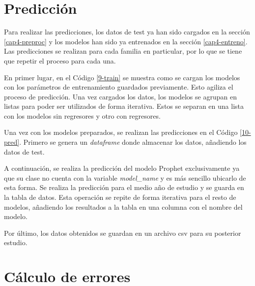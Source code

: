 

\section{Predicción}

Para realizar las predicciones, los datos de test ya han sido cargados en la sección \ref{cap4-preproc} y los modelos han sido ya entrenados en la sección \ref{cap4-entreno}. Las predicciones se realizan para cada familia en particular, por lo que se tiene que repetir el proceso para cada una.

En primer lugar, en el Código \ref{9-train} se muestra como se cargan los modelos con los parámetros de entrenamiento guardados previamente. Esto agiliza el proceso de predicción. Una vez cargados los datos, los modelos se agrupan en listas para poder ser utilizados de forma iterativa. Estos se separan en una lista con los modelos sin regresores y otro con regresores.



Una vez con los modelos preparados, se realizan las predicciones en el Código \ref{10-pred}. Primero se genera un \textit{dataframe} donde almacenar los datos, añadiendo los datos de test.

A continuación, se realiza la predicción del modelo Prophet exclusivamente ya que su clase no cuenta con la variable \textit{model\_name} y es más sencillo ubicarlo de esta forma. Se realiza la predicción para el medio año de estudio y se guarda en la tabla de datos. Esta operación se repite de forma iterativa para el resto de modelos, añadiendo los resultados a la tabla en una columna con el nombre del modelo.

Por último, los datos obtenidos se guardan en un archivo csv para su posterior estudio.



\section{Cálculo de errores}

